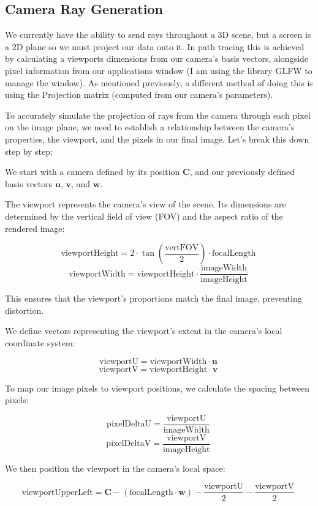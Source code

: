 \documentclass[12pt]{article}
\begin{document}
\subsection{Camera Ray Generation}
\label{sec:cam_ray_gen}
We currently have the ability to send rays throughout a 3D scene, but a screen is a 2D plane so we must project our data onto it. In path tracing this is achieved by calculating a viewports dimensions from our camera's basis vectors, alongside pixel information from our applications window (I am using the library GLFW to manage the window). As mentioned previously, a different method of doing this is using the Projection matrix (computed from our camera's parameters).

To accurately simulate the projection of rays from the camera through each pixel on the image plane, we need to establish a relationship between the camera's properties, the viewport, and the pixels in our final image. Let's break this down step by step:

We start with a camera defined by its position $\mathbf{C}$, and our previously defined basis vectors $\mathbf{u}$, $\mathbf{v}$, and $\mathbf{w}$.

The viewport represents the camera's view of the scene. Its dimensions are determined by the vertical field of view (FOV) and the aspect ratio of the rendered image:

$$ \text{viewportHeight} = 2 \cdot \tan\left(\frac{\text{vertFOV}}{2}\right) \cdot \text{focalLength}
    \ $$
$$ \text{viewportWidth} = \text{viewportHeight} \cdot \frac{\text{imageWidth}}{\text{imageHeight}}
    \ $$

This ensures that the viewport's proportions match the final image, preventing distortion.

We define vectors representing the viewport's extent in the camera's local coordinate system:

$$ \text{viewportU} = \text{viewportWidth} \cdot \mathbf{u}
    \ $$
$$ \text{viewportV} = \text{viewportHeight} \cdot \mathbf{v}
    \ $$

To map our image pixels to viewport positions, we calculate the spacing between pixels:

$$ \text{pixelDeltaU} = \frac{\text{viewportU}}{\text{imageWidth}}
    \ $$
$$ \text{pixelDeltaV} = \frac{\text{viewportV}}{\text{imageHeight}}
    \ $$

We then position the viewport in the camera's local space:

$$ \text{viewportUpperLeft} = \mathbf{C} - (\text{focalLength} \cdot \mathbf{w}) - \frac{\text{viewportU}}{2} - \frac{\text{viewportV}}{2}
    \ $$
\end{document}
